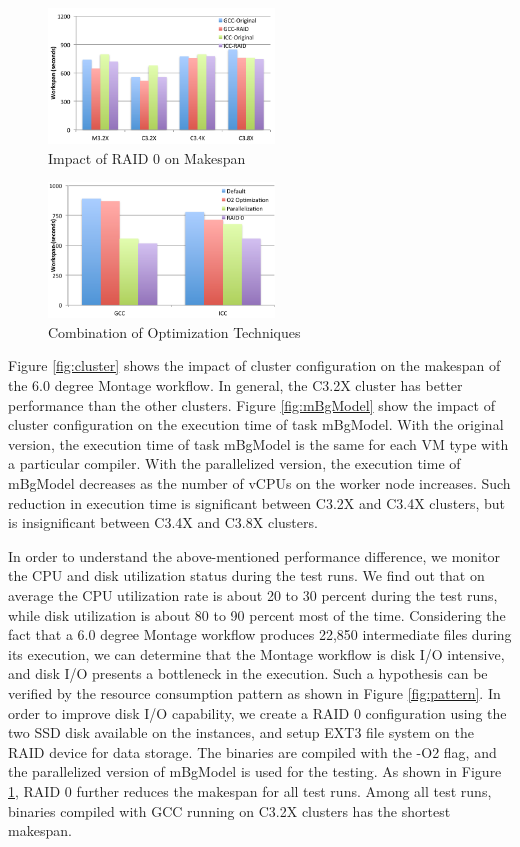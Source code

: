 \begin{figure}[t!]
\centering
\includegraphics[width=6cm]{fig05}
\caption{Impact of RAID 0 on Makespan}
\label{fig:raid}
\end{figure}

\begin{figure}[t!]
\centering
\includegraphics[width=6cm]{fig06}
\caption{Combination of Optimization Techniques}
\label{fig:combine}
\end{figure}

Figure \ref{fig:cluster} shows the impact of cluster configuration on the makespan of the 6.0 degree Montage workflow. In general, the C3.2X cluster has better performance than the other clusters. Figure \ref{fig:mBgModel} show the impact of cluster configuration on the execution time of task mBgModel. With the original version, the execution time of task mBgModel is the same for each VM type with a particular compiler. With the parallelized version, the execution time of mBgModel decreases as the number of vCPUs on the worker node increases. Such reduction in execution time is significant between C3.2X and C3.4X clusters, but is insignificant between C3.4X and C3.8X clusters. 

In order to understand the above-mentioned performance difference, we monitor the CPU and disk utilization status during the test runs. We find out that on average the CPU utilization rate is about 20 to 30 percent during the test runs, while disk utilization is about 80 to 90 percent most of the time. Considering the fact that a 6.0 degree Montage workflow produces 22,850 intermediate files during its execution, we can determine that the Montage workflow is disk I/O intensive, and disk I/O presents a bottleneck in the execution. Such a hypothesis can be verified by the resource consumption pattern as shown in Figure \ref{fig:pattern}. In order to improve disk I/O capability, we create a RAID 0 configuration using the two SSD disk available on the instances, and setup EXT3 file system on the RAID device for data storage. The binaries are compiled with the -O2 flag, and the parallelized version of mBgModel is used for the testing. As shown in Figure \ref{fig:raid}, RAID 0 further reduces the makespan for all test runs. Among all test runs, binaries compiled with GCC running on C3.2X clusters has the shortest makespan.

